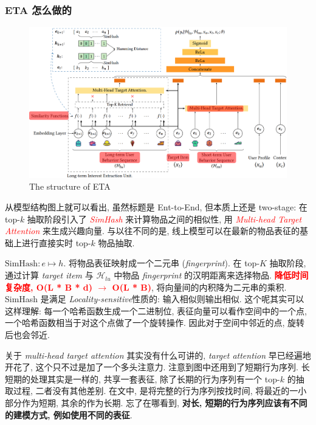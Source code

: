 \subsubsection{ETA 怎么做的}
\begin{figure}[h]
	\centering
	\includegraphics[width=\textwidth]{pics/ETA.png}
	\caption{The structure of ETA}
	\label{fig:eta}
\end{figure}

从模型结构图上就可以看出, 虽然标题是 Ent-to-End, 但本质上还是 two-stage: 在 top-$k$ 抽取阶段引入了 \textcolor{red}{\textit{SimHash}} 来计算物品之间的相似性, 用 \textcolor{red}{\textit{Multi-head Target Attention}} 来生成兴趣向量. 与以往不同的是, 线上模型可以在最新的物品表征的基础上进行直接实时 top-$k$ 物品抽取. 

$\text{SimHash}: e \longmapsto h$. 将物品表征映射成一个二元串 (\textit{fingerprint}). 在 top-$K$ 抽取阶段, 通过计算 \textit{target item} 与 $\mathcal{H}_{lu}$ 中物品 \textit{fingerprint} 的汉明距离来选择物品. \textbf{\textcolor{red}{降低时间复杂度, O(L * B * d) $\rightarrow$ O(L * B)}}, 将向量间的内积降为二元串的乘积. SimHash 是满足 \textit{Locality-sensitive}性质的: 输入相似则输出相似. 这个呢其实可以这样理解: 每一个哈希函数生成一个二进制位, 表征向量可以看作空间中的一个点, 一个哈希函数相当于对这个点做了一个旋转操作. 因此对于空间中邻近的点, 旋转后也会邻近. 

关于 \textit{multi-head target attention} 其实没有什么可讲的, \textit{target attention} 早已经遍地开花了, 这个只不过是加了一个多头注意力. 注意到图中还用到了短期行为序列. 长短期的处理其实是一样的, 共享一套表征, 除了长期的行为序列有一个 top-$k$ 的抽取过程, 二者没有其他差别. 在文中, 是将完整的行为序列按找时间, 将最近的一小部分作为短期, 其余的作为长期. 忘了在哪看到, \textbf{对长, 短期的行为序列应该有不同的建模方式, 例如使用不同的表征}. 


